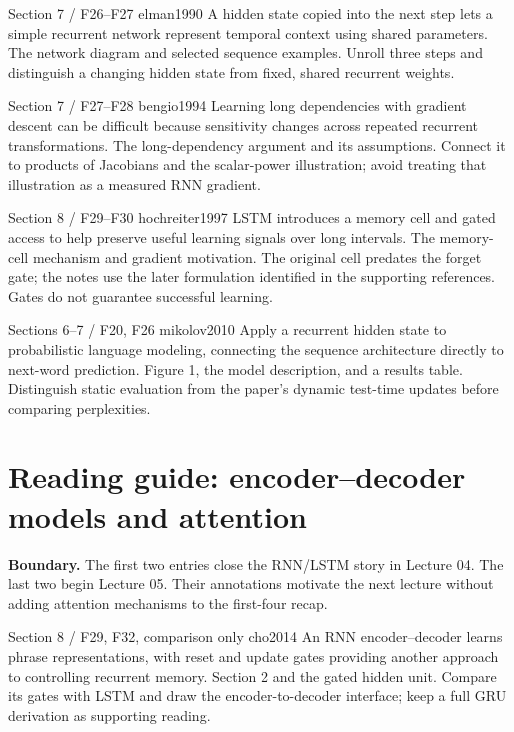   {Section 7 \quad / \quad F26--F27}
  {elman1990}
  {A hidden state copied into the next step lets a simple recurrent network
  represent temporal context using shared parameters.}
  {The network diagram and selected sequence examples. Unroll three steps
  and distinguish a changing hidden state from fixed, shared recurrent weights.}

  {Section 7 \quad / \quad F27--F28}
  {bengio1994}
  {Learning long dependencies with gradient descent can be difficult
  because sensitivity changes across repeated recurrent transformations.}
  {The long-dependency argument and its assumptions. Connect it to
  products of Jacobians and the scalar-power illustration; avoid treating
  that illustration as a measured RNN gradient.}

  {Section 8 \quad / \quad F29--F30}
  {hochreiter1997}
  {LSTM introduces a memory cell and gated access to help preserve useful
  learning signals over long intervals.}
  {The memory-cell mechanism and gradient motivation. The original cell
  predates the forget gate; the notes use the later formulation identified
  in the supporting references. Gates do not guarantee successful learning.}

  {Sections 6--7 \quad / \quad F20, F26}
  {mikolov2010}
  {Apply a recurrent hidden state to probabilistic language modeling,
  connecting the sequence architecture directly to next-word prediction.}
  {Figure 1, the model description, and a results table. Distinguish
  static evaluation from the paper's dynamic test-time updates before
  comparing perplexities.}

\clearpage
\section{Reading guide: encoder--decoder models and attention}
\textbf{Boundary.} The first two entries close the RNN/LSTM story in
Lecture 04. The last two begin Lecture 05. Their annotations motivate the
next lecture without adding attention mechanisms to the first-four recap.

  {Section 8 \quad / \quad F29, F32, comparison only}
  {cho2014}
  {An RNN encoder--decoder learns phrase representations, with reset and
  update gates providing another approach to controlling recurrent memory.}
  {Section 2 and the gated hidden unit. Compare its gates with LSTM and
  draw the encoder-to-decoder interface; keep a full GRU derivation as
  supporting reading.}

